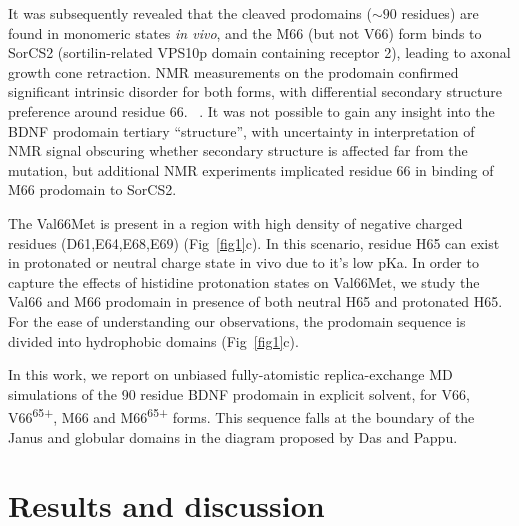 \documentclass[journal=jacsat,manuscript=article]{achemso}
\begin{document}
It was subsequently revealed that the cleaved prodomains ($\sim90$ residues) are found in monomeric states {\it in vivo}, and the M66 (but not V66) form binds to SorCS2 (sortilin-related VPS10p domain containing receptor 2), leading to axonal growth cone retraction.\cite{Anastasia2013} NMR measurements on the prodomain confirmed significant intrinsic disorder for both forms, with differential secondary structure preference around residue 66. ~\cite {Anastasia2013}.  It was not possible to gain any insight into the BDNF prodomain tertiary ``structure'', with uncertainty in interpretation of NMR signal obscuring whether secondary structure is affected far from the mutation, but additional NMR experiments implicated residue 66 in binding of M66 prodomain 
 to SorCS2.~\cite {Anastasia2013}
 
The Val66Met is present in a region with high density of negative charged residues (D61,E64,E68,E69) (Fig~\ref{fig1}c). In this scenario, residue H65 can exist in protonated or neutral charge state in vivo due to it's low pKa. In order to capture the effects of histidine protonation states on Val66Met, we study the Val66 and M66 prodomain in presence of both neutral H65 and protonated H65. For the ease of understanding our observations, the prodomain sequence is divided into hydrophobic domains (Fig~\ref{fig1}c).

In this work, we report on unbiased fully-atomistic replica-exchange MD simulations of the 90 residue BDNF prodomain in explicit solvent, for V66,   V66\textsuperscript{65+}, M66 and  M66\textsuperscript{65+} forms.  This sequence falls at the boundary of the Janus and globular domains in the diagram proposed by Das and Pappu. \cite{Das2015,Das2013a} 

\section{Results and discussion}

\end{document}
